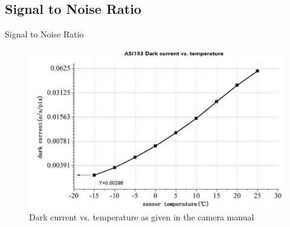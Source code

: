 \documentclass[11pt, aspectratio=169]{beamer}
\begin{document}
\subsection{Signal to Noise Ratio}
\begin{frame}{Signal to Noise Ratio}
\begin{figure}[!htb]
    \hspace{-2cm}
    \begin{minipage}{0.6\textwidth}
        \centering
        \includegraphics[width=0.9\linewidth]{figures/images/darkcurrent.PNG}
        \caption{Dark current vs. temperature as given in the camera manual}
    \end{minipage}%
    \begin{minipage}{0.2\textwidth}
	 	\centering

\end{minipage}
\end{figure}
\end{frame}
\end{document}
